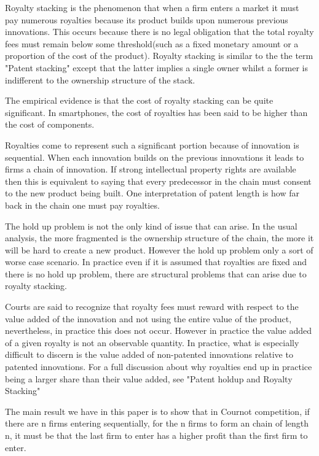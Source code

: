 \documentclass[11pt]{article}
\begin{document}
Royalty stacking is the phenomenon that when a firm enters a market it must pay numerous royalties because its product builds upon numerous previous innovations. This occurs because there is no legal obligation that the total royalty fees must remain below some threshold(such as a fixed monetary amount or a proportion of the cost of the product). Royalty stacking is similar to the the term "Patent stacking" except that the latter implies a single owner whilst a former is indifferent to the ownership structure of the stack. 

The empirical evidence is that the cost of royalty stacking can be quite significant. In smartphones, the cost of royalties has been said to be higher than the cost of components. 

Royalties come to represent such a significant portion because of innovation is sequential. When each innovation builds on the previous innovations it leads to firms a chain of innovation. If strong intellectual property rights are available then this is equivalent to saying that every predecessor in the chain must consent to the new product being built. One interpretation of patent length is how far back in the chain one must pay royalties. 

The hold up problem is not the only kind of issue that can arise. In the usual analysis, the more fragmented is the ownership structure of the chain, the more it will be hard to create a new product. However the hold up problem only a sort of worse case scenario. In practice even if it is assumed that royalties are fixed and there is no hold up problem, there are structural problems that can arise due to royalty stacking. 

Courts are said to recognize that royalty fees must reward with respect to the value added of the innovation and not using the entire value of the product, nevertheless, in practice this does not occur. However in practice the value added of a given royalty is not an observable quantity. In practice, what is especially difficult to discern is the value added of non-patented innovations relative to patented innovations. For a full discussion about why royalties end up in practice being a larger share than their value added, see "Patent holdup and Royalty Stacking"

The main result we have in this paper is to show that in Cournot competition, if there are n firms entering sequentially, for the n firms to form an chain of length n, it must be that the last firm to enter has a higher profit than the first firm to enter. 
\end{document}
